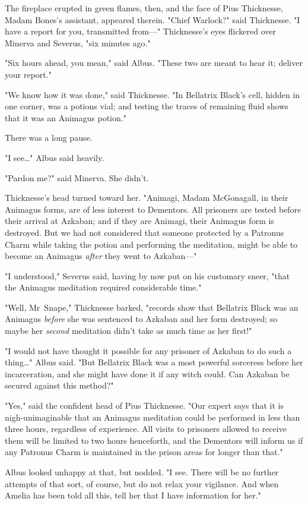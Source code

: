 The fireplace erupted in green flames, then, and the face of Pius Thicknesse,
Madam Bones's assistant, appeared therein. "Chief Warlock?" said Thicknesse. "I
have a report for you, transmitted from---" Thicknesse's eyes flickered over
Minerva and Severus, "six minutes ago."

"Six hours ahead, you mean," said Albus. "These two are meant to hear it;
deliver your report."

"We know how it was done," said Thicknesse. "In Bellatrix Black's cell, hidden
in one corner, was a potions vial; and testing the traces of remaining fluid
shows that it was an Animagus potion."

There was a long pause.

"I see…" Albus said heavily.

"Pardon me?" said Minerva. She didn't.

Thicknesse's head turned toward her. "Animagi, Madam McGonagall, in their
Animagus forms, are of less interest to Dementors. All prisoners are tested
before their arrival at Azkaban; and if they are Animagi, their Animagus form
is destroyed. But we had not considered that someone protected by a Patronus
Charm while taking the potion and performing the meditation, might be able to
become an Animagus \emph{after} they went to Azkaban---"

"I understood," Severus said, having by now put on his customary sneer, "that
the Animagus meditation required considerable time."

"Well, Mr~Snape," Thicknesse barked, "records show that Bellatrix Black was an
Animagus \emph{before} she was sentenced to Azkaban and her form destroyed; so
maybe her \emph{second} meditation didn't take as much time as her first!"

"I would not have thought it possible for any prisoner of Azkaban to do such a
thing…" Albus said. "But Bellatrix Black was a most powerful sorceress
before her incarceration, and she might have done it if any witch could. Can
Azkaban be secured against this method?"

"Yes," said the confident head of Pius Thicknesse. "Our expert says that it is
nigh-unimaginable that an Animagus meditation could be performed in less than
three hours, regardless of experience. All visits to prisoners allowed to
receive them will be limited to two hours henceforth, and the Dementors will
inform us if any Patronus Charm is maintained in the prison areas for longer
than that."

Albus looked unhappy at that, but nodded. "I see. There will be no further
attempts of that sort, of course, but do not relax your vigilance. And when
Amelia has been told all this, tell her that I have information for her."

